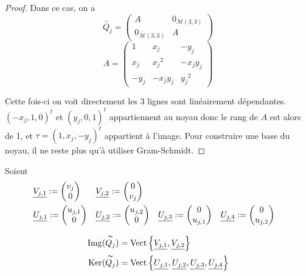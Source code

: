 \begin{proof}
Dans ce cas, on a 
\[
\tilde{Q_j} = \begin{pmatrix} A & 0_{\mathcal M(3,3)} \\ 0_{\mathcal M(3,3)} & A\end{pmatrix}\]
\[A = \begin{pmatrix}
 1 & {x_j} & -{y_j} \\
 {x_j} & {x_j}^2 & -{x_jy_j} \\
 -{y_j} & -{x_jy_j} & {y_j}^2
\end{pmatrix}
\]

Cette fois-ci on voit directement les 3 lignes sont linéairement dépendantes. $(-x_j, 1, 0)^t$ et $(y_j, 0, 1)^t$ appartiennent au noyau donc le rang de $A$ est alors de 1, et $\tau =  (1,x_j,-y_j)^t$ appartient à l'image. Pour construire une base du noyau, il ne reste plus qu'à utiliser Gram-Schmidt.

\end{proof}

Soient
\begin{align*}
&\underline{V_{j,1}} := \begin{pmatrix} v_{j} \\ 0 \end{pmatrix} &
&\underline{V_{j,2}} := \begin{pmatrix} 0 \\ v_{j} \end{pmatrix} & & \\
&\underline{U_{j,1}} := \begin{pmatrix} u_{j,1} \\ 0 \end{pmatrix} &
&\underline{U_{j,2}} := \begin{pmatrix} u_{j,2} \\ 0 \end{pmatrix} &
&\underline{U_{j,3}} := \begin{pmatrix} 0 \\ u_{j,1} \end{pmatrix} &
&\underline{U_{j,4}} := \begin{pmatrix} 0 \\ u_{j,2} \end{pmatrix}
\end{align*}

\begin{prop}
  \begin{align*}
    \operatorname{Img}(\overset{\thicksim}{Q_j}) &= \operatorname{Vect}\left\lbrace\underline{V_{j,1}},\underline{V_{j,2}}\right\rbrace\\
    \operatorname{Ker}(\overset{\thicksim}{Q_j}) &= \operatorname{Vect}\left\lbrace\underline{U_{j,1}},\underline{U_{j,2}},\underline{U_{j,3}},\underline{U_{j,4}}\right\rbrace
  \end{align*}
\end{prop}

